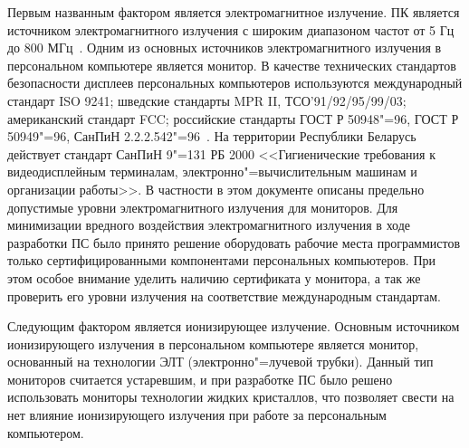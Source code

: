 Первым названным фактором является электромагнитное излучение.
ПК является источником электромагнитного излучения с широким диапазоном частот от 5 Гц до 800 МГц~\cite{ot_emr_pc}.
Одним из основных источников электромагнитного излучения в персональном компьютере является монитор.
В качестве технических стандартов безопасности дисплеев персональных компьютеров используются
  международный стандарт ISO 9241;
  шведские стандарты MPR II, ТСО'91/92/95/99/03;
  американский стандарт FCC;
  российские стандарты ГОСТ Р 50948"=96, ГОСТ Р 50949"=96, СанПиН 2.2.2.542"=96~\cite{ot_emr_pc}.
На территории Республики Беларусь действует стандарт СанПиН 9"=131 РБ 2000 <<Гигиенические требования к видеодисплейным терминалам, электронно"=вычислительным машинам и организации работы>>.
В частности в этом документе описаны предельно допустимые уровни электромагнитного излучения для мониторов.
Для минимизации вредного воздействия электромагнитного излучения в ходе разработки ПС было принято решение оборудовать рабочие места программистов только сертифицированными компонентами персональных компьютеров. При этом особое внимание уделить наличию сертификата у монитора, а так же проверить его уровни излучения на соответствие международным стандартам.

Следующим фактором является ионизирующее излучение.
Основным источником ионизирующего излучения в персональном компьютере является монитор, основанный на технологии ЭЛТ (электронно"=лучевой трубки).
Данный тип мониторов считается устаревшим, и при разработке ПС было решено использовать мониторы технологии жидких кристаллов,
что позволяет свести на нет влияние ионизирующего излучения при работе за персональным компьютером.


